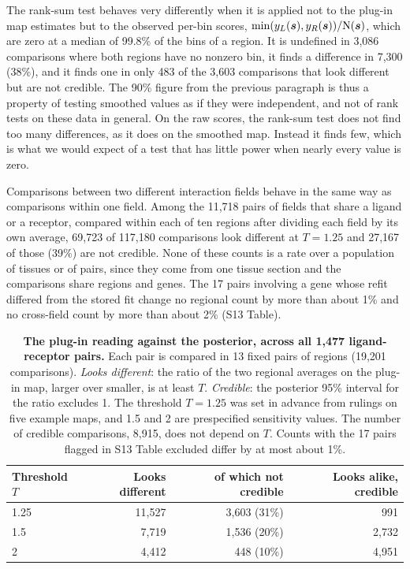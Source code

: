 \documentclass[10pt,letterpaper]{article}
\begin{document}
The rank-sum test behaves very differently when it is applied not to the plug-in map estimates but to the observed per-bin scores, $\min(y_L(\mbox{\boldmath $s$}), y_R(\mbox{\boldmath $s$}))/\mbox{N}(\mbox{\boldmath $s$})$, which are zero at a median of 99.8\% of the bins of a region. It is undefined in 3,086 comparisons where both regions have no nonzero bin, it finds a difference in 7,300 (38\%), and it finds one in only 483 of the 3,603 comparisons that look different but are not credible. The 90\% figure from the previous paragraph is thus a property of testing smoothed values as if they were independent, and not of rank tests on these data in general. On the raw scores, the rank-sum test does not find too many differences, as it does on the smoothed map. Instead it finds few, which is what we would expect of a test that has little power when nearly every value is zero.

Comparisons between two different interaction fields behave in the same way as comparisons within one field. Among the 11,718 pairs of fields that share a ligand or a receptor, compared within each of ten regions after dividing each field by its own average, 69,723 of 117,180 comparisons look different at $T = 1.25$ and 27,167 of those (39\%) are not credible. None of these counts is a rate over a population of tissues or of pairs, since they come from one tissue section and the comparisons share regions and genes. The 17 pairs involving a gene whose refit differed from the stored fit change no regional count by more than about 1\% and no cross-field count by more than about 2\% (S13 Table).

\begin{table}[!ht]
\centering
\caption{{\bf The plug-in reading against the posterior, across all 1,477 ligand-receptor pairs.} Each pair is compared in 13 fixed pairs of regions (19,201 comparisons). \textit{Looks different}: the ratio of the two regional averages on the plug-in map, larger over smaller, is at least $T$. \textit{Credible}: the posterior 95\% interval for the ratio excludes 1. The threshold $T = 1.25$ was set in advance from rulings on five example maps, and 1.5 and 2 are prespecified sensitivity values. The number of credible comparisons, 8,915, does not depend on $T$. Counts with the 17 pairs flagged in S13 Table excluded differ by at most about 1\%.}
\label{tab:systematic}
\begin{tabular}{|l|rrr|}
  \hline
  Threshold $T$ & Looks different & of which not credible & Looks alike, credible \\
  \hline
  1.25 & 11,527 & 3,603 (31\%) & 991 \\
  1.5  & 7,719 & 1,536 (20\%) & 2,732 \\
  2    & 4,412 & 448 (10\%) & 4,951 \\
  \hline
\end{tabular}
\end{table}
\end{document}
